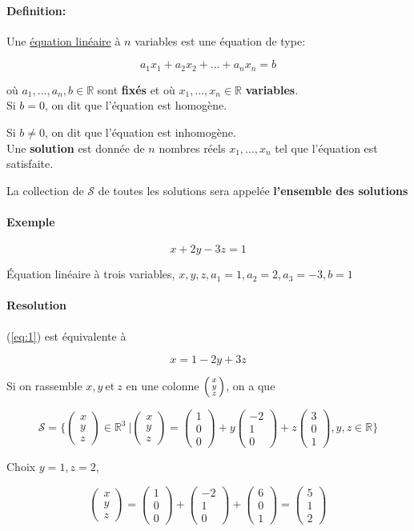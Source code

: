\documentclass[
    11pt,
    a4paper,
    oneside,
    headinlcude, footinclude,
    twoside,
]{report}
\newcommand{\tvect}[3]{%
   \ensuremath{\Bigl(\begin{smallmatrix}#1\\#2\\#3\end{smallmatrix}\Bigr)}}
\newcommand{\myVector}[3]{\begin{pmatrix}#1\\#2\\#3\end{pmatrix}}
\begin{document}
\paragraph{Definition:} 
\label{par:definition}

Une \underline{équation linéaire}  à $n$ variables est une équation de type:

$$ a_{1} x_{1} + a_{2} x_{2} + ... + a_{n} x_{n} = b$$

où $a _{1}, ..., a _{n}, b \in \mathbb{R}$ sont \textbf{fixés} et où $x _{1},
..., x _{n} \in \mathbb{R}$ \textbf{variables}.
\\

Si \underline{$b = 0$}, on dit que l'équation est homogène.

Si \underline{$b \neq 0$}, on dit que l'équation est inhomogène.
\\

Une \textbf{solution} est donnée de $n$  nombres réels $x _{1}, ... ,x _{n}$
tel que l'équation est satisfaite.

La collection de $\mathcal{S}$ de toutes les solutions sera appelée
\textbf{l'ensemble des solutions} 

\paragraph{Exemple}

\begin{equation} \label{eq:1}
    x + 2y - 3z = 1 
\end{equation}

Équation linéaire à trois variables, $x, y, z, a _{1} = 1, a _{2} = 2, a _{3}
= -3, b = 1$

\paragraph{Resolution}

(\ref{eq:1}) est équivalente à 

$$ x = 1 - 2y + 3z$$

Si on rassemble $x, y \ \textrm{et}\ z$ en une colonne $\tvect{x}{y}{z}$, on a
que 

$$ \mathcal{S} = \Bigg\{ \myVector{x}{y}{z} \in \mathbb{R} ^{3} \ \Bigg|
\myVector{x}{y}{z} = \myVector{1}{0}{0} + y\myVector{-2}{1}{0} +
z\myVector{3}{0}{1}, y, z \in \mathbb{R} \Bigg\} $$

Choix $y = 1, z = 2$, 

$$ \myVector{x}{y}{z} = \myVector{1}{0}{0} + \myVector{-2}{1}{0} +
\myVector{6}{0}{1} = \myVector{5}{1}{2} $$
\end{document}

